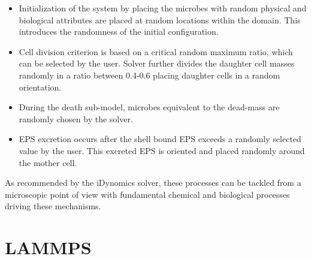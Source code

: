 \documentclass[11pt,a4paper,openright]{article}
\begin{document}
\begin{itemize}
\item Initialization of the system by placing the microbes with random physical and biological attributes are placed at random locations within the domain. This introduces the randomness of the initial configuration. 

\item Cell division criterion is based on a critical random maximum ratio, which can be selected by the user. Solver further divides the daughter cell masses randomly in a ratio between 0.4-0.6 placing daughter cells in a random orientation. 

\item During the death sub-model, microbes equivalent to the dead-mass are randomly chosen by the solver. 

\item EPS excretion occurs after the shell bound EPS exceeds a randomly selected value by the user. This excreted EPS is oriented and placed randomly around the mother cell. 

\end{itemize}

As recommended by the iDynomics solver, these processes can be tackled from a microscopic point of view with fundamental chemical and biological processes driving these mechanisms.   

%
\section{LAMMPS}
\end{document}
